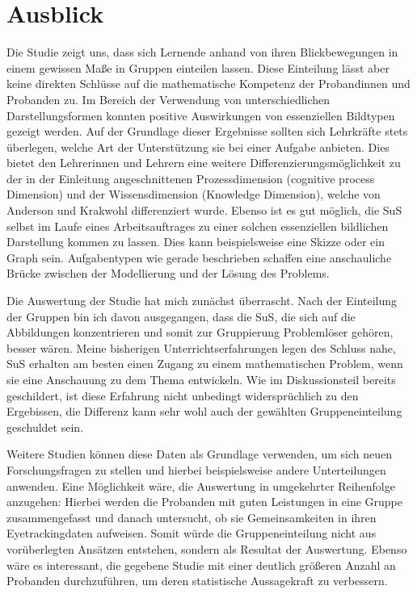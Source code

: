 \chapter{Ausblick}
Die Studie zeigt uns, dass sich Lernende anhand von ihren Blickbewegungen in einem gewissen Maße in Gruppen einteilen lassen. Diese Einteilung lässt aber keine direkten Schlüsse auf die mathematische Kompetenz der Probandinnen und Probanden zu.  Im Bereich der Verwendung von unterschiedlichen Darstellungsformen konnten positive Auswirkungen von essenziellen Bildtypen gezeigt werden.  Auf der Grundlage dieser Ergebnisse sollten sich Lehrkräfte stets überlegen, welche Art der Unterstützung sie bei einer Aufgabe anbieten. Dies bietet den Lehrerinnen und Lehrern eine weitere Differenzierungsmöglichkeit zu der in der Einleitung angeschnittenen Prozessdimension (cognitive process Dimension) und der Wissensdimension (Knowledge Dimension), welche von Anderson und Krakwohl differenziert wurde\cite{anderson2001taxonomy}. Ebenso ist es gut möglich, die \gls{SuS} selbst im Laufe eines Arbeitsauftrages zu einer solchen essenziellen bildlichen Darstellung kommen zu lassen. Dies kann beispielsweise eine Skizze oder ein Graph sein. Aufgabentypen wie gerade beschrieben schaffen eine anschauliche Brücke zwischen der Modellierung und der Lösung des Problems.


Die Auswertung der Studie hat mich zunächst überrascht. Nach der Einteilung der Gruppen bin ich davon ausgegangen, dass die SuS, die sich auf die Abbildungen konzentrieren und somit zur Gruppierung Problemlöser gehören, besser wären. Meine bisherigen Unterrichtserfahrungen legen des Schluss nahe, SuS erhalten am besten einen Zugang zu einem mathematischen Problem, wenn sie eine Anschauung zu dem Thema entwickeln. Wie im Diskussionsteil bereits geschildert, ist diese Erfahrung nicht unbedingt widersprüchlich zu den Ergebissen, die Differenz kann sehr wohl auch der gewählten Gruppeneinteilung geschuldet sein. 


Weitere Studien können diese Daten als Grundlage verwenden, um sich neuen Forschungsfragen zu stellen und hierbei beispielsweise andere Unterteilungen anwenden. Eine Möglichkeit wäre, die Auswertung in umgekehrter Reihenfolge anzugehen: Hierbei werden die Probanden mit guten Leistungen in eine Gruppe zusammengefasst und danach untersucht, ob sie Gemeinsamkeiten in ihren Eyetrackingdaten aufweisen. Somit würde die Gruppeneinteilung nicht aus vorüberlegten Ansätzen entstehen, sondern als Resultat der Auswertung. 
Ebenso wäre es interessant, die gegebene Studie mit einer deutlich größeren Anzahl an Probanden durchzuführen, um deren statistische Aussagekraft zu verbessern.